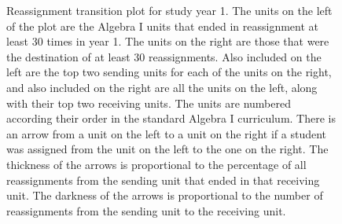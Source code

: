 \documentclass[12pt]{article}\usepackage[]{graphicx}\usepackage[]{color}
\begin{document}
\begin{figure}
\begin{subfigure}{1in}
\end{subfigure}
\caption{Reassignment transition plot for study year 1. The units on
  the left of the plot are the Algebra I units that ended in reassignment at
  least 30 times in year 1. The units on the right are those that were
  the destination of at least 30 reassignments. Also included on the
  left are the top two sending units for each of the units on the
  right, and also included on the right are all the units on the left,
  along with their top two receiving units. The units are numbered
  according their order in the standard Algebra I curriculum. There is an arrow from a
  unit on the left to a unit on the right if a student was assigned
  from the unit on the left to the one on the right. The thickness of
  the arrows is proportional to the percentage of all reassignments from
  the sending unit that ended in that receiving unit. The darkness of
  the arrows is proportional to the number of reassignments from the
  sending unit to the receiving unit.}
\label{fig:trans1}
\end{figure}
\end{document}
